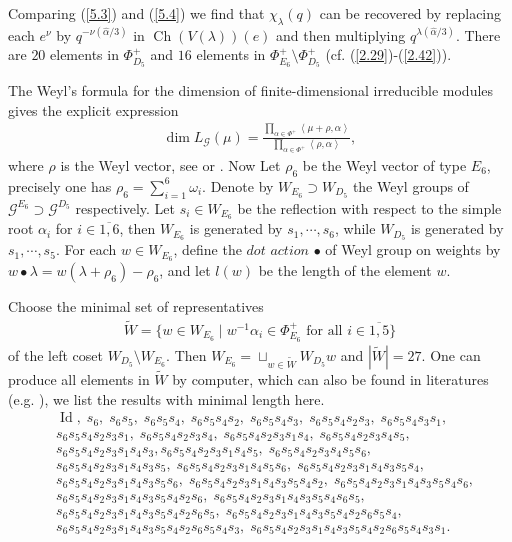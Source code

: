 \documentclass[12pt]{article}
\numberwithin{equation}{section}
\theoremstyle{definition}
\theoremstyle{remark}
\begin{document}
Comparing (\ref{5.3}) and (\ref{5.4}) we find that $\chi_{\lambda}(q)$ can be recovered by replacing each $e^{\nu}$ by $q^{-\nu(\widehat{\alpha}/3)}$ in $\operatorname{Ch}(V(\lambda))(e)$ and then multiplying $q^{\lambda(\widehat{\alpha}/3)}$.
There are $20$ elements in $\Phi_{D_5}^+$ and $16$ elements in $\Phi_{E_6}^{+}\setminus\Phi_{D_5}^{+}$ (cf. (\ref{2.29})-(\ref{2.42})).

The Weyl's formula for the dimension of finite-dimensional irreducible modules gives the explicit expression
\begin{eqnarray}
	\dim L_{\mathscr{G}}(\mu)=\frac{\prod_{\alpha\in\Phi^+}\left\langle \mu+\rho,\alpha\right\rangle }{\prod_{\alpha\in\Phi^+}\left\langle \rho,\alpha\right\rangle }, \label{5.11}
\end{eqnarray}
where $\rho$ is the Weyl vector, see \cite[Corollary 24.3]{Hum} or \cite[Theorem 5.5.1]{Xu2}. Now Let $\rho_6$ be the Weyl vector of type $E_6$, precisely one has $\rho_6=\sum_{i=1}^6\omega_i$.
Denote by $W_{E_6}\supset W_{D_5}$ the Weyl groups of $\mathscr{G}^{E_6}\supset \mathscr{G}^{D_5}$ respectively. Let $s_i\in W_{E_6}$ be the reflection with respect to the simple root $\alpha_i$ for $i\in\overline{1,6}$, then $W_{E_6}$ is generated by $s_1,\cdots,s_6$, while $W_{D_5}$ is generated by $s_1,\cdots,s_5$. For each $w\in W_{E_6}$, define the $dot$ $action$ $\bullet$ of Weyl group on weights by $w\bullet\lambda=w(\lambda+\rho_6)-\rho_6$, and let $l(w)$ be the length of the element $w$. 

Choose the minimal set of representatives
\begin{eqnarray*}
	\widetilde{W}=\{w\in W_{E_6}\mid w^{-1}\alpha_i\in\Phi^{+}_{E_6}\text{ for all }i\in\overline{1,5}\}
\end{eqnarray*}
of the left coset $W_{D_5}\setminus W_{E_6}$.
Then $W_{E_6}=\sqcup_{w\in\widetilde{W}}W_{D_5}w$ and $|\widetilde{W}|=27$. One can produce all elements in $\widetilde{W}$ by computer, which can also be found in literatures (e.g. \cite{DZ1,DZ2}), we list the results with minimal length here.
\begin{eqnarray}
	&\operatorname{Id},\; s_6,\;s_6s_5,\;s_6s_5s_4,\;s_6s_5s_4s_2,\;s_6s_5s_4s_3,\;s_6s_5s_4s_2s_3,\;s_6s_5s_4s_3s_1,\label{w1}\\
	&s_6s_5s_4s_2s_3s_1,\;s_6s_5s_4s_2s_3s_4,\;s_6s_5s_4s_2s_3s_1s_4,\;s_6s_5s_4s_2s_3s_4s_5,\\
	&s_6s_5s_4s_2s_3s_1s_4s_3,s_6s_5s_4s_2s_3s_1s_4s_5,\;s_6s_5s_4s_2s_3s_4s_5s_6,\\
	&s_6s_5s_4s_2s_3s_1s_4s_3s_5,\;s_6s_5s_4s_2s_3s_1s_4s_5s_6,\;s_6s_5s_4s_2s_3s_1s_4s_3s_5s_4,\\
	&s_6s_5s_4s_2s_3s_1s_4s_3s_5s_6,\;s_6s_5s_4s_2s_3s_1s_4s_3s_5s_4s_2,\;s_6s_5s_4s_2s_3s_1s_4s_3s_5s_4s_6,\\
	&s_6s_5s_4s_2s_3s_1s_4s_3s_5s_4s_2s_6,\;s_6s_5s_4s_2s_3s_1s_4s_3s_5s_4s_6s_5,\\
	&s_6s_5s_4s_2s_3s_1s_4s_3s_5s_4s_2s_6s_5,\;s_6s_5s_4s_2s_3s_1s_4s_3s_5s_4s_2s_6s_5s_4,\\
	&s_6s_5s_4s_2s_3s_1s_4s_3s_5s_4s_2s_6s_5s_4s_3,\;s_6s_5s_4s_2s_3s_1s_4s_3s_5s_4s_2s_6s_5s_4s_3s_1.\label{w8}
\end{eqnarray}
\end{document}
